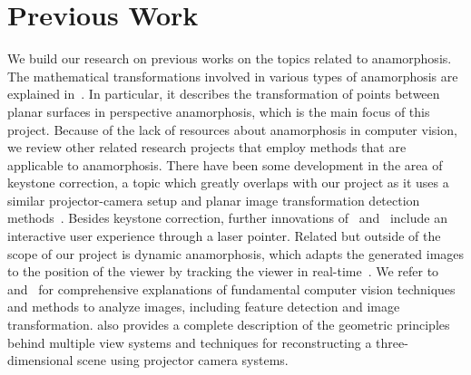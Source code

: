 \documentclass[11pt, oneside, reqno]{book}
\begin{document}

\section{Previous Work}
\label{sec:prev}

We build our research on previous works on the topics related to anamorphosis. The mathematical transformations involved in various types of anamorphosis are explained in~\cite{hunt2000anamorphic}. In particular, it describes the transformation of points between planar surfaces in perspective anamorphosis, which is the main focus of this project. 
Because of the lack of resources about anamorphosis in computer vision, we review other related research projects that employ methods that are applicable to anamorphosis. There have been some development in the area of keystone correction, a topic which greatly overlaps with our project as it uses a similar projector-camera setup and planar image transformation detection methods~\cite{sukthankar2001smarter, brazzini2005computer}. Besides keystone correction, further innovations of~\cite{brazzini2005computer} and~\cite{sukthankar2001smarter} include an interactive user experience through a laser pointer. 
Related but outside of the scope of our project is dynamic anamorphosis, which adapts the generated images to the position of the viewer by tracking the viewer in real-time~\cite{solina2007dynamic, ravnik2013dynamic}.
We refer to~\cite{szeliski2010computer} and~\cite{hartley2003multiple} for comprehensive explanations of fundamental computer vision techniques and methods to analyze images, including feature detection and image transformation. \cite{hartley2003multiple} also provides a complete description of the geometric principles behind multiple view systems and techniques for reconstructing a three-dimensional scene using projector camera systems. 














\end{document}
